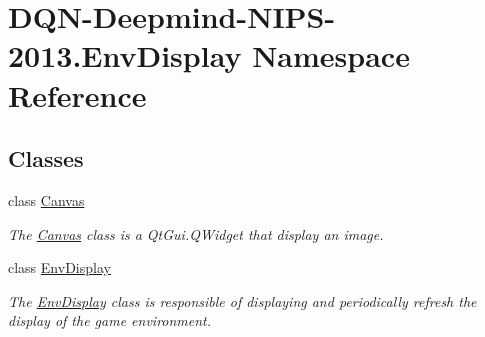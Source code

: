 \hypertarget{namespaceDQN-Deepmind-NIPS-2013_1_1EnvDisplay}{}\section{D\+Q\+N-\/\+Deepmind-\/\+N\+I\+P\+S-\/2013.Env\+Display Namespace Reference}
\label{namespaceDQN-Deepmind-NIPS-2013_1_1EnvDisplay}
\subsection*{Classes}
\begin{DoxyCompactItemize}
\item 
class \hyperlink{classDQN-Deepmind-NIPS-2013_1_1EnvDisplay_1_1Canvas}{Canvas}
\begin{DoxyCompactList}\small\item\em The \hyperlink{classDQN-Deepmind-NIPS-2013_1_1EnvDisplay_1_1Canvas}{Canvas} class is a Qt\+Gui.\+Q\+Widget that display an image. \end{DoxyCompactList}\item 
class \hyperlink{classDQN-Deepmind-NIPS-2013_1_1EnvDisplay_1_1EnvDisplay}{Env\+Display}
\begin{DoxyCompactList}\small\item\em The \hyperlink{classDQN-Deepmind-NIPS-2013_1_1EnvDisplay_1_1EnvDisplay}{Env\+Display} class is responsible of displaying and periodically refresh the display of the game environment. \end{DoxyCompactList}\end{DoxyCompactItemize}
